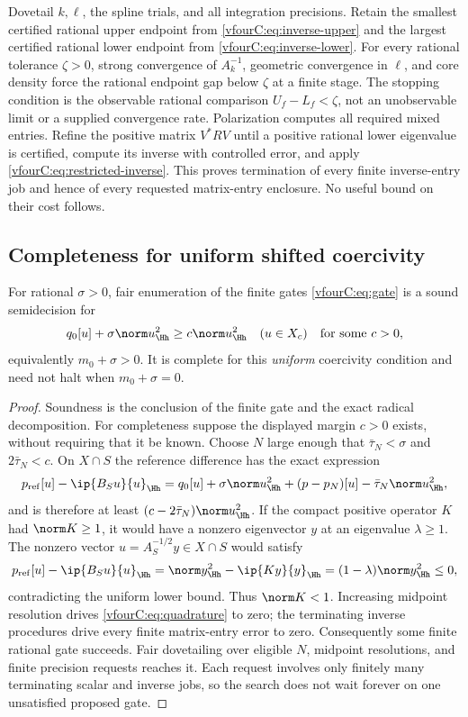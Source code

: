 Dovetail $k,\ell$, the spline trials, and all integration precisions.  Retain the
smallest certified rational upper endpoint from
\eqref{vfourC:eq:inverse-upper} and the largest certified rational lower endpoint
from \eqref{vfourC:eq:inverse-lower}.  For every rational tolerance $\zeta>0$,
strong convergence of $A_k^{-1}$, geometric convergence in $\ell$, and core
density force the rational endpoint gap below $\zeta$ at a finite stage.
The stopping condition is the observable rational comparison
$U_f-L_f<\zeta$, not an unobservable limit or a supplied convergence rate.
Polarization computes all required mixed entries.  Refine the positive matrix
$V^*RV$ until a positive rational lower eigenvalue is certified, compute its
inverse with controlled error, and apply \eqref{vfourC:eq:restricted-inverse}.
This proves termination of every finite inverse-entry job and hence of every
requested matrix-entry enclosure.  No useful bound on their cost follows.

\subsection{Completeness for uniform shifted coercivity}
\label{vfourC:subsec:coercivity}

\begin{proposition}
\label{vfourC:prop:strict-shift}
For rational $\sigma>0$, fair enumeration of the finite gates
\eqref{vfourC:eq:gate} is a sound semidecision for
\[
 q_0[u]+\sigma\norm u_{\Hh}^2\ge c\norm u_{\Hh}^2
       \quad(u\in X_c)\quad\text{for some }c>0,
\]
equivalently $m_0+\sigma>0$.  It is complete for this \emph{uniform} coercivity
condition and need not halt when $m_0+\sigma=0$.
\end{proposition}
\begin{proof}
Soundness is the conclusion of the finite gate and the exact radical
decomposition.  For completeness suppose the displayed margin $c>0$ exists,
without requiring that it be known.  Choose $N$ large enough that
$\bar\tau_N<\sigma$ and $2\bar\tau_N<c$.  On $X\cap S$ the reference difference
has the exact expression
\[
 p_{\mathrm{ref}}[u]-\ip{B_Su}{u}_{\Hh}
   =q_0[u]+\sigma\norm u_{\Hh}^2
       +(p-p_N)[u]-\bar\tau_N\norm u_{\Hh}^2,
\]
and is therefore at least $(c-2\bar\tau_N)\norm u_{\Hh}^2$.
If the compact positive operator $K$ had $\norm K\ge1$, it would have a
nonzero eigenvector $y$ at an eigenvalue $\lambda\ge1$.  The nonzero vector
$u=A_S^{-1/2}y\in X\cap S$ would satisfy
\[
 p_{\mathrm{ref}}[u]-\ip{B_Su}{u}_{\Hh}
      =\norm y_{\Hh}^2-\ip{Ky}{y}_{\Hh}
      =(1-\lambda)\norm y_{\Hh}^2\le0,
\]
contradicting the uniform lower bound.  Thus $\norm K<1$.  Increasing midpoint
resolution drives \eqref{vfourC:eq:quadrature} to zero; the terminating inverse
procedures drive every finite matrix-entry error to zero.  Consequently some
finite rational gate succeeds.  Fair dovetailing over eligible $N$, midpoint
resolutions, and finite precision requests reaches it.  Each request involves
only finitely many terminating scalar and inverse jobs, so the search does not
wait forever on one unsatisfied proposed gate.
\end{proof}

